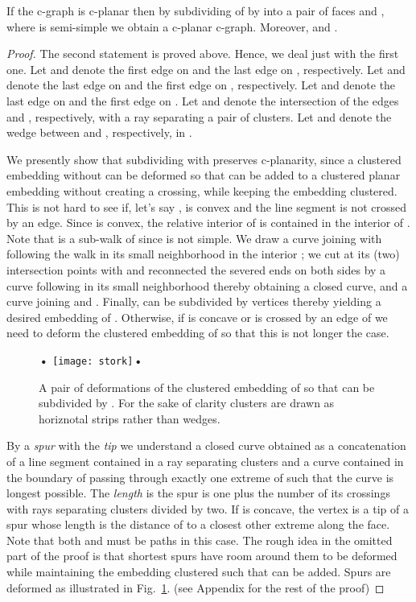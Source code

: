 \documentclass{llncs}
\newif\iflong
\begin{document}
\begin{lemma}
\label{lemma:norm}
If the c-graph  is c-planar then by subdividing  of  by  into
a pair of faces  and , where  is semi-simple we obtain a c-planar c-graph. Moreover, 
 and .
\end{lemma}
\begin{proof}
The second statement is proved above.
Hence, we deal just with the first one.
Let  and  denote the first edge on  and the last edge on , respectively. Let  and 
denote the last edge on  and the first edge on , respectively.
Let  and  denote the last edge on  and the first edge on .
Let    and 
 denote the intersection of the edges  and , respectively,  with a ray separating a pair of clusters.
Let  and  denote the wedge between  and , respectively, in .


We presently show that subdividing  with   preserves c-planarity, since a clustered
embedding without  can be deformed so that  can be added to a clustered planar embedding without creating a crossing, while keeping the embedding clustered. 
This is not hard to see if, let's say , is convex and the line segment  is not crossed by an edge. Since  is
convex, the relative interior of  is contained in the interior of . Note that  is a sub-walk of  since  is not simple. We draw a curve  joining  with  following the walk  in its small neighborhood in the interior ; we cut  at its (two) intersection points with  and reconnected the severed ends on both sides by a curve following  in its small neighborhood thereby obtaining a closed curve, and a curve  joining   and . Finally,  can be subdivided by vertices thereby 
yielding a desired embedding of .
Otherwise, if  is concave
or  is crossed by an edge of  we need to deform the clustered
embedding of  so that this is not longer the case.

 \begin{figure}[h]
  \centering
\centering\textbf{•}
{
\texttt{[image: stork]}\textbf{•}
    	}

\caption{A pair of deformations of the clustered embedding of  so that  can be subdivided by . For the sake of clarity clusters are drawn as horiznotal strips rather than wedges.}
 \label{fig:stork}
\end{figure}


By a \emph{spur} with the \emph{tip}  we understand a closed curve  obtained  as  a concatenation of a line segment contained in a ray separating clusters
and a curve contained in the boundary of  passing through exactly one extreme 
of  such that the curve is longest possible. The \emph{length} is the spur
is one plus the number of its crossings with rays separating clusters divided by two.
 If  is concave, the vertex  is a tip of a spur whose length is the distance of  to a closest other extreme along the face. Note that both  and  must be paths in this case.
The rough idea in the omitted part of the proof is that shortest spurs have room around them to be deformed while maintaining the embedding
clustered such that  can be added.
Spurs  are deformed  as illustrated in Fig.~\ref{fig:stork}. (see Appendix for the rest of the proof)
\iflong



\end{proof}
\end{document}
